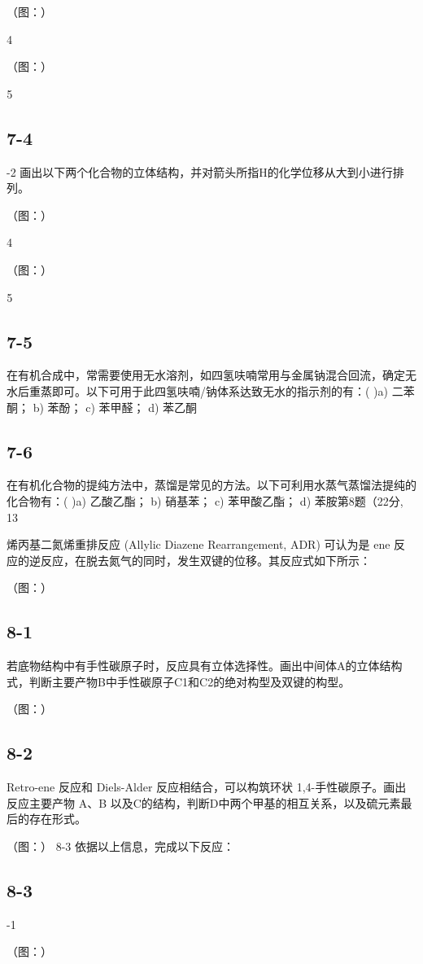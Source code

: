（图：）



（图：）



\subsection*{7-4}
-2 画出以下两个化合物的⽴体结构，并对箭头所指H的化学位移从⼤到⼩进⾏排列。

（图：）



（图：）



\subsection*{7-5}
在有机合成中，常需要使⽤⽆⽔溶剂，如四氢呋喃常⽤与⾦属钠混合回流，确定⽆⽔后重蒸即可。以下可⽤于此四氢呋喃/钠体系达致⽆⽔的指⽰剂的有：( )a) ⼆苯酮； b) 苯酚； c) 苯甲醛； d) 苯⼄酮

\subsection*{7-6}
在有机化合物的提纯⽅法中，蒸馏是常⻅的⽅法。以下可利⽤⽔蒸⽓蒸馏法提纯的化合物有：( )a) ⼄酸⼄酯； b) 硝基苯； c) 苯甲酸⼄酯； d) 苯胺第8题（22分, 13%

烯丙基⼆氮烯重排反应 (Allylic Diazene Rearrangement, ADR) 可认为是 ene 反应的逆反应，在脱去氮⽓的同时，发⽣双键的位移。其反应式如下所⽰：

（图：）

\subsection*{8-1}
若底物结构中有⼿性碳原⼦时，反应具有⽴体选择性。画出中间体A的⽴体结构式，判断主要产物B中⼿性碳原⼦C1和C2的绝对构型及双键的构型。

（图：）

\subsection*{8-2}
Retro-ene 反应和 Diels-Alder 反应相结合，可以构筑环状 1,4-⼿性碳原⼦。画出反应主要产物 A、B 以及C的结构，判断D中两个甲基的相互关系，以及硫元素最后的存在形式。

（图：）
8-3 依据以上信息，完成以下反应：

\subsection*{8-3}
-1

（图：）

